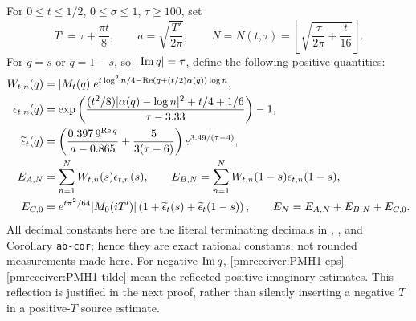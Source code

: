 For $0\le t\le1/2$, $0\le\sigma\le1$, $\tau\ge100$, set
\begin{equation}\label{pmreceiver:PMH1-cutoff}
 T'=\tau+\frac{\pi t}{8},\qquad
 a=\sqrt{\frac{T'}{2\pi}},\qquad
 N=N(t,\tau)=\left\lfloor\sqrt{\frac{\tau}{2\pi}+\frac t{16}}\right\rfloor.
\end{equation}
For $q=s$ or $q=1-s$, so $|\operatorname{Im} q|=\tau$, define the following
positive quantities:
\begin{align}
 W_{t,n}(q)&=|M_t(q)|
 e^{t\log^2n/4-\operatorname{Re}(q+(t/2)\alpha(q))\log n},
 \label{pmreceiver:PMH1-W}\\
 \epsilon_{t,n}(q)&=
 \exp\left(\frac{(t^2/8)|\alpha(q)-\log n|^2+t/4+1/6}
 {\tau-3.33}\right)-1,
 \label{pmreceiver:PMH1-eps}\\
 \widetilde\epsilon_t(q)&=
 \left(\frac{0.397\,9^{\operatorname{Re} q}}{a-0.865}
       +\frac5{3(\tau-6)}\right)e^{3.49/(\tau-4)},
 \label{pmreceiver:PMH1-tilde}\\
 E_{A,N}&=\sum_{n=1}^N W_{t,n}(s)\epsilon_{t,n}(s),
 \qquad E_{B,N}=\sum_{n=1}^N W_{t,n}(1-s)\epsilon_{t,n}(1-s),
 \label{pmreceiver:PMH1-EAB}\\
 E_{C,0}&=e^{t\pi^2/64}|M_0(iT')|
       \left(1+\widetilde\epsilon_t(s)+\widetilde\epsilon_t(1-s)\right),
 \qquad E_N=E_{A,N}+E_{B,N}+E_{C,0}.
 \label{pmreceiver:PMH1-EC}
\end{align}
All decimal constants here are the literal terminating decimals in
, , and Corollary \texttt{ab-cor}; hence they
are exact rational constants, not rounded measurements made here.
For negative $\operatorname{Im} q$, \eqref{pmreceiver:PMH1-eps}--\eqref{pmreceiver:PMH1-tilde} mean the
reflected positive-imaginary estimates. This reflection is justified
in the next proof, rather than silently inserting a negative $T$ in a
positive-$T$ source estimate.

